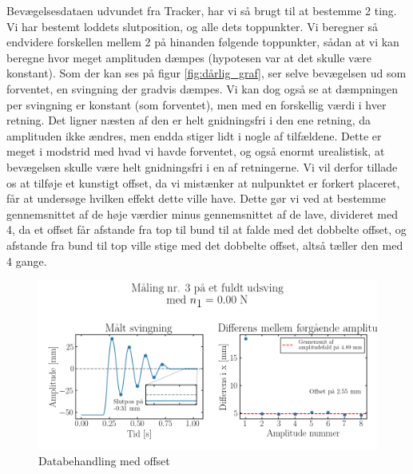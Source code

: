 Bevægelsesdataen udvundet fra Tracker, har vi så brugt til at bestemme 2 ting. Vi har bestemt loddets slutposition, og alle dets toppunkter. 
Vi beregner så endvidere forskellen mellem 2 på hinanden følgende toppunkter, sådan at vi kan beregne hvor meget amplituden dæmpes (hypotesen var at det skulle være konstant).
Som der kan ses på figur \ref{fig:dårlig_graf}, ser selve bevægelsen ud som forventet, en svingning der gradvis dæmpes. 
Vi kan dog også se at dæmpningen per svingning er konstant (som forventet), men med en forskellig værdi i hver retning. 
Det ligner næsten af den er helt gnidningsfri i den ene retning, da amplituden ikke ændres, men endda stiger lidt i nogle af tilfældene.
Dette er meget i modstrid med hvad vi havde forventet, og også enormt urealistisk, at bevægelsen skulle være helt gnidningsfri i en af retningerne. 
Vi vil derfor tillade os at tilføje et kunstigt offset, da vi mistænker at nulpunktet er forkert placeret, får at undersøge hvilken effekt dette ville have. 
Dette gør vi ved at bestemme gennemsnittet af de høje værdier minus gennemsnittet af de lave, divideret med 4, da et offset får afstande fra top til bund til at falde med det dobbelte offset, 
og afstande fra bund til top ville stige med det dobbelte offset, altså tæller den med 4 gange.
\begin{figure}[htbp]
    \centering
    \includegraphics[width=0.8\linewidth,origin=c]{figures/n0.00-maks3-offset.png}
    \caption{Databehandling med offset}
    \label{fig:offset_graf}
\end{figure}

